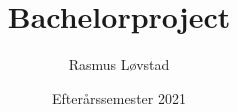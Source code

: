 \documentclass[12pt,a4paper,oneside,draft]{article}
\begin{document}
\title{Bachelorproject}
\author{Rasmus Løvstad}
\date{Efterårssemester 2021}
\maketitle
\begin{abstract}

\end{abstract}
\tableofcontents







\end{document}

